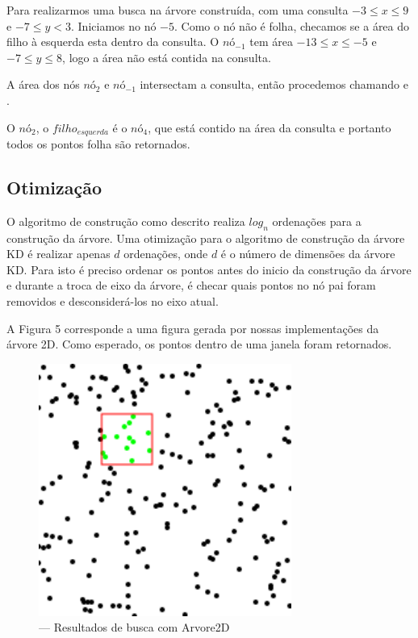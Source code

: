 Para realizarmos uma busca na árvore construída, com uma consulta $ -3 \leq x \leq 9 $ e $-7 \leq y < 3$.
Iniciamos no nó $-5$. Como o nó não é folha, checamos se a área do filho à esquerda esta dentro da consulta.
O $nó_{-1}$ tem área $ -13 \leq x \leq -5 $ e  $ -7 \leq y \leq 8$, logo a área não está contida 
na consulta.

A área dos nós $nó_2$ e $nó_{-1}$ intersectam a consulta, então procedemos chamando
 e .

O $nó_{2}$, o $filho_{esquerda}$ é o $nó_4$, que está contido na área da consulta e portanto todos
os pontos folha são retornados.

\subsection{Otimização}
O algoritmo de construção como descrito realiza $log_n$ ordenações para a construção da árvore.
Uma otimização para o algoritmo de construção da árvore KD é realizar apenas $d$ ordenações, onde $d$
é o número de dimensões da árvore KD.
Para isto é preciso ordenar os pontos antes do inicio da construção da árvore e durante a troca de eixo
da árvore, é checar quais pontos no nó pai foram removidos e desconsiderá-los no eixo atual.

A Figura 5 corresponde a uma figura gerada por nossas implementações da árvore 2D. Como esperado, os
pontos dentro de uma janela foram retornados.
\begin{figure}[H][scale=0.5]
    \caption{\label{fig:Fig_54} — Resultados de busca com Arvore2D}
    \begin{center}
        \includegraphics{images/points.pdf}
    \end{center}
\end{figure}
\clearpage



